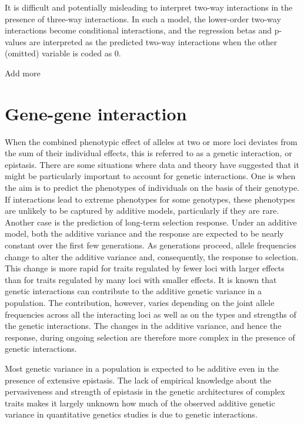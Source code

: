 \documentclass[
]{book}
\begin{document}
It is difficult and potentially misleading to interpret two-way interactions in the presence of three-way interactions. In such a model, the lower-order two-way interactions become conditional interactions, and the regression betas and p-values are interpreted as the predicted two-way interactions when the other (omitted) variable is coded as 0.

Add more

\hypertarget{gene-gene-interaction}{%
\chapter{Gene-gene interaction}\label{gene-gene-interaction}}

When the combined phenotypic effect of alleles at two or more loci deviates from the sum of their individual effects, this is referred to as a genetic interaction, or epistasis.
There are some situations where data and theory have suggested that it might be particularly important to account for genetic interactions. One is when the aim is to predict the phenotypes of individuals on the basis of their genotype. If interactions lead to extreme phenotypes for some genotypes, these phenotypes are unlikely to be captured by additive models, particularly if they are rare. Another case is the prediction of long-term selection response. Under an additive model, both the additive variance and the response are expected to be nearly constant over the first few generations. As generations proceed, allele frequencies change to alter the additive variance and, consequently, the response to selection. This change is more rapid for traits regulated by fewer loci with larger effects than for traits regulated by many loci with smaller effects. It is known that genetic interactions can contribute to the additive genetic variance in a population. The contribution, however, varies depending on the joint allele frequencies across all the interacting loci as well as on the types and strengths of the genetic interactions. The changes in the additive variance, and hence the response, during ongoing selection are therefore more complex in the presence of genetic interactions.

Most genetic variance in a population is expected to be additive even in the presence of extensive epistasis. The lack of empirical knowledge about the pervasiveness and strength of epistasis in the genetic architectures of complex traits makes it largely unknown how much of the observed additive genetic variance in quantitative genetics studies is due to genetic interactions.
\end{document}
